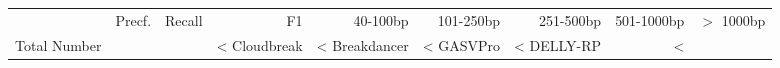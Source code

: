 \begin{table}[t]
\begin{center}
\begin{tabular}{rrrr|rrrrr}
  \hline
                        & Precf. & Recall & F1 & 40-100bp  & 101-250bp  & 251-500bp & 501-1000bp & $>$ 1000bp \\ 
 Total Number &          &           & <%
  \hline
  Cloudbreak    &  <%
  Breakdancer   &  <%
  GASVPro        & <%
  DELLY-RP           & <%

\end{tabular}
\end{center}
\end{table}
